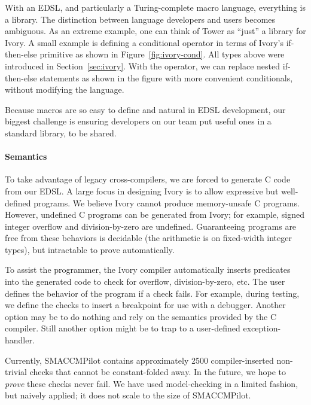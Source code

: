 With an EDSL, and particularly a Turing-complete macro language, everything is a
library.  The distinction between language developers and users becomes
ambiguous.  As an extreme example, one can think of Tower as ``just'' a library
for Ivory.  A small example is defining a conditional operator in terms of
Ivory's if-then-else primitive as shown in Figure~\ref{fig:ivory-cond}.  All
types above were introduced in Section~\ref{sec:ivory}.  With the 
operator, we can replace nested if-then-else statements as shown in the figure
with more convenient conditionals, without modifying the language.

Because macros are so easy to define and natural in EDSL development, our
biggest challenge is ensuring developers on our team put useful ones in a
standard library, to be shared.


\paragraph{Semantics}
To take advantage of legacy cross-compilers, we are forced to
generate C code from our EDSL.  A large focus in designing Ivory is to allow
expressive but well-defined programs.  We believe Ivory
cannot produce memory-unsafe C programs.  However, undefined C programs can be
generated from Ivory; for example, signed integer overflow and division-by-zero
are undefined.  Guaranteeing programs are free from these behaviors is decidable
(the arithmetic is on fixed-width integer types), but intractable to prove
automatically.

To assist the programmer, the Ivory compiler automatically inserts predicates
into the generated code to check for overflow, division-by-zero, etc.  The user
defines the behavior of the program if a check fails.  For example, during
testing, we define the checks to insert a breakpoint for use with a debugger.
Another option may be to do nothing and rely on the semantics provided by the C
compiler.  Still another option might be to trap to a user-defined
exception-handler.

Currently, SMACCMPilot contains approximately 2500 compiler-inserted non-trivial
checks that cannot be constant-folded away.  In the future, we hope to
\emph{prove} these checks never fail.  We have used model-checking in a limited
fashion, but naively applied; it does not scale to the size of SMACCMPilot.

